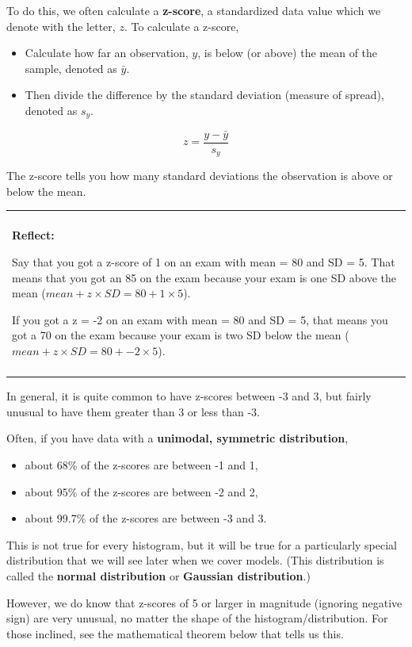 \documentclass[
]{book}
\providecommand{\tightlist}{%
  \setlength{\itemsep}{0pt}\setlength{\parskip}{0pt}}
\newenvironment{reflect}
{
    \begin{center}
    
    \begin{tabular}{|p{0.8\textwidth}|}
    \rowcolor{LightBlue}
    \hline\\
    \rowcolor{LightBlue}
    \textbf{Reflect:}
}
{
    \\\rowcolor{LightBlue}
    \\\hline
    \end{tabular} 
    \end{center}
}
\begin{document}
To do this, we often calculate a \textbf{z-score}, a standardized data value which we denote with the letter, \(z\). To calculate a z-score,

\begin{itemize}
\tightlist
\item
  Calculate how far an observation, \(y\), is below (or above) the mean of the sample, denoted as \(\bar{y}\).
\item
  Then divide the difference by the standard deviation (measure of spread), denoted as \(s_y\).
\end{itemize}

\[ z = \frac{y - \bar{y}}{s_y} \]

The z-score tells you how many standard deviations the observation is above or below the mean.

\begin{reflect}
Say that you got a z-score of 1 on an exam with mean = 80 and SD = 5.
That means that you got an 85 on the exam because your exam is one SD
above the mean (\(mean + z \times SD = 80 + 1 \times 5\)).

If you got a z = -2 on an exam with mean = 80 and SD = 5, that means you
got a 70 on the exam because your exam is two SD below the mean
(\(mean + z \times SD = 80 + -2 \times 5\)).
\end{reflect}

In general, it is quite common to have z-scores between -3 and 3, but fairly unusual to have them greater than 3 or less than -3.

Often, if you have data with a \textbf{unimodal, symmetric distribution},

\begin{itemize}
\tightlist
\item
  about 68\% of the z-scores are between -1 and 1,
\item
  about 95\% of the z-scores are between -2 and 2,
\item
  about 99.7\% of the z-scores are between -3 and 3.
\end{itemize}

This is not true for every histogram, but it will be true for a particularly special distribution that we will see later when we cover models. (This distribution is called the \textbf{normal distribution} or \textbf{Gaussian distribution}.)

However, we do know that z-scores of 5 or larger in magnitude (ignoring negative sign) are very unusual, no matter the shape of the histogram/distribution. For those inclined, see the mathematical theorem below that tells us this.
\end{document}
